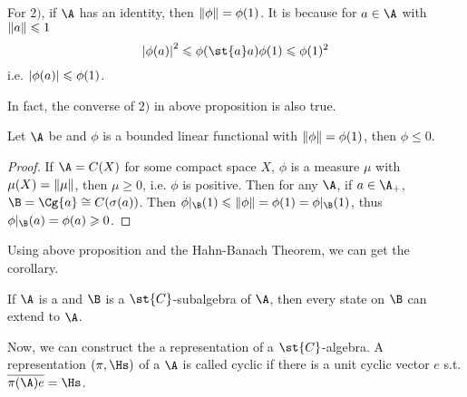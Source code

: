 \begin{rem}
	For $2)$, if $\A$ has an identity, then $\left\lVert\phi\right\lVert = \phi(1)$. It is because for $a \in \A$ with $\left\lVert a\right\lVert \leqslant 1$
	\begin{equation*}
		\abs{\phi(a)}^2 \leqslant \phi(\st{a}a)\phi(1) \leqslant \phi(1)^2
	\end{equation*}
	i.e. $\left\lvert\phi(a)\right\lvert \leqslant \phi(1)$.
\end{rem}

In fact, the converse of $2)$ in above proposition is also true.
\begin{prop}
	Let $\A$ be \Cs and $\phi$ is a bounded linear functional with $\left\lVert\phi\right\lVert = \phi(1)$, then $\phi \leqslant 0$.
\end{prop}
\begin{proof}
	If $\A=C(X)$ for some compact space $X$, $\phi$ is a measure $\mu$ with $\mu(X)=\left\lVert\mu\right\lVert$, then $\mu \geqslant 0$, i.e. $\phi$ is positive. Then for any $\A$, if $a \in \A_{+}$, $\B=\Cg{a} \cong C(\sigma(a))$. Then $\phi|_\B(1) \leqslant \norm{\phi} = \phi(1) = \phi|_\B(1)$, thus $\phi|_\B(a) = \phi(a) \geqslant 0$.
\end{proof}
Using above proposition and the Hahn-Banach Theorem, we can get the corollary.
\begin{cor}
	If $\A$ is a \Cs and $\B$ is a $\st{C}$-subalgebra of $\A$, then every state on $\B$ can extend to $\A$.
\end{cor}	

Now, we can construct the a representation of a $\st{C}$-algebra. A representation $(\pi,\Hs)$ of a \Cs $\A$ is called cyclic if there is a unit cyclic vector $e$ s.t. $\clo{\pi(\A)e} = \Hs$.

